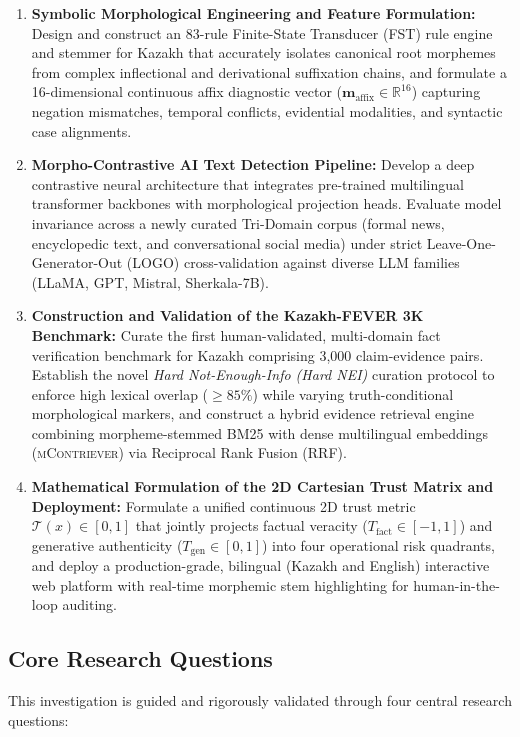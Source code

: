 \begin{enumerate}[leftmargin=*, label=\textbf{Obj \arabic*:}]
    \item \textbf{Symbolic Morphological Engineering and Feature Formulation:} Design and construct an 83-rule Finite-State Transducer (FST) rule engine and stemmer for Kazakh that accurately isolates canonical root morphemes from complex inflectional and derivational suffixation chains, and formulate a 16-dimensional continuous affix diagnostic vector ($\mathbf{m}_{\text{affix}} \in \mathbb{R}^{16}$) capturing negation mismatches, temporal conflicts, evidential modalities, and syntactic case alignments.
    \item \textbf{Morpho-Contrastive AI Text Detection Pipeline:} Develop a deep contrastive neural architecture that integrates pre-trained multilingual transformer backbones with morphological projection heads. Evaluate model invariance across a newly curated Tri-Domain corpus (formal news, encyclopedic text, and conversational social media) under strict Leave-One-Generator-Out (LOGO) cross-validation against diverse LLM families (LLaMA, GPT, Mistral, Sherkala-7B).
    \item \textbf{Construction and Validation of the Kazakh-FEVER 3K Benchmark:} Curate the first human-validated, multi-domain fact verification benchmark for Kazakh comprising 3,000 claim-evidence pairs. Establish the novel \textit{Hard Not-Enough-Info (Hard NEI)} curation protocol to enforce high lexical overlap ($\ge 85\%$) while varying truth-conditional morphological markers, and construct a hybrid evidence retrieval engine combining morpheme-stemmed BM25 with dense multilingual embeddings (\textsc{mContriever}) via Reciprocal Rank Fusion (RRF).
    \item \textbf{Mathematical Formulation of the 2D Cartesian Trust Matrix and Deployment:} Formulate a unified continuous 2D trust metric $\mathcal{T}(x) \in [0, 1]$ that jointly projects factual veracity ($T_{\text{fact}} \in [-1, 1]$) and generative authenticity ($T_{\text{gen}} \in [0, 1]$) into four operational risk quadrants, and deploy a production-grade, bilingual (Kazakh and English) interactive web platform with real-time morphemic stem highlighting for human-in-the-loop auditing.
\end{enumerate}

\subsection{Core Research Questions}
This investigation is guided and rigorously validated through four central research questions:

